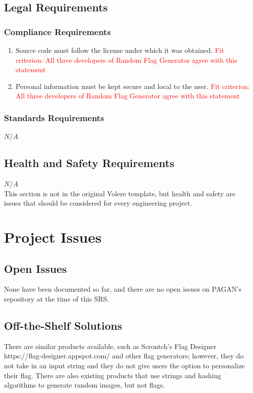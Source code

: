 \documentclass[12pt, titlepage]{article}
\begin{document}
\subsection{Legal Requirements}
\subsubsection{Compliance Requirements}
\begin{enumerate}[label=LR\arabic*., series=lrs]
    \item Source code must follow the license under which it was obtained. \textcolor{red}{Fit criterion: All three developers of Random Flag Generator agree with this statement}
    \item Personal information must be kept secure and local to the user. \textcolor{red}{Fit criterion: All three developers of Random Flag Generator agree with this statement}
\end{enumerate}
\subsubsection{Standards Requirements}
$N/A$
\subsection{Health and Safety Requirements}
$N/A$\\
This section is not in the original Volere template, but health and safety are
issues that should be considered for every engineering project.

\section{Project Issues}

\subsection{Open Issues}

None have been documented so far, and there are no open issues on PAGAN's repository at the time of this SRS. 

\subsection{Off-the-Shelf Solutions}

There are similar products available, such as Scrontch's Flag Designer https://flag-designer.appspot.com/ and other flag generators; however, they do not take in an input string and they do not give users the option to personalize their flag. There are also existing products that use strings and hashing algorithms to generate random images, but not flags.
\end{document}
